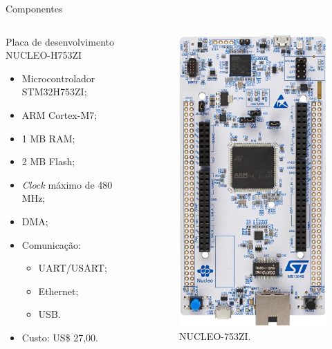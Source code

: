 \documentclass{if-beamer}
\begin{document}
\begin{frame}{Componentes}
	
		\begin{columns}
		
		\begin{column}{0.6\textwidth}
			
	\begin{block}{Placa de desenvolvimento NUCLEO-H753ZI}
	
	\begin{itemize}
		\item Microcontrolador STM32H753ZI;
		\item ARM Cortex-M7;
		\item 1 MB RAM;
		\item 2 MB Flash;
		\item \textit{Clock} máximo de 480 MHz;
		\item DMA;
		\item Comunicação:
		\begin{itemize}
			\item UART/USART;
			\item Ethernet;
			\item USB.
		\end{itemize}
		\item Custo: US\$ 27,00.
	\end{itemize}
	
\end{block}
			
		\end{column}
		
		\begin{column}{0.4\textwidth}
			
			\begin{figure}[H]
				\centering
				\includegraphics[width=0.55\linewidth]{img/nucleo}
				\caption{NUCLEO-753ZI.}
				\label{fig:nucleo}
			\end{figure}
			

\end{column}
\end{columns}
\end{frame}
\end{document}
